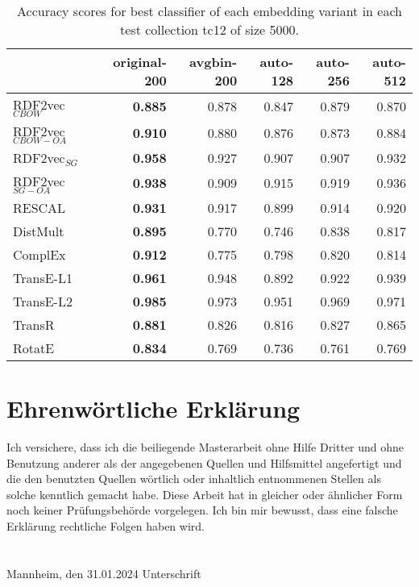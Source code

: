\documentclass[11pt,titlepage,oneside,openany]{book}
\begin{document}
\begin{table}[h!]
\centering
\begin{tabular}{lrrrrr}
\toprule
{} &  original-200 &  avgbin-200 &  auto-128 &  auto-256 &  auto-512 \\
\midrule
RDF2vec$_{CBOW}$     &	\textbf{0.885} &       0.878  &     0.847  &     0.879  &     0.870  \\
RDF2vec$_{CBOW-OA}$  &	\textbf{0.910} &       0.880  &     0.876  &     0.873  &     0.884  \\
RDF2vec$_{SG}$       &	\textbf{0.958} &       0.927  &     0.907  &     0.907  &     0.932  \\
RDF2vec$_{SG-OA}$    &	\textbf{0.938} &       0.909  &     0.915  &     0.919  &     0.936  \\
RESCAL               &	\textbf{0.931} &       0.917  &     0.899  &     0.914  &     0.920  \\
DistMult             &	\textbf{0.895} &       0.770  &     0.746  &     0.838  &     0.817  \\
ComplEx              &	\textbf{0.912} &       0.775  &     0.798  &     0.820  &     0.814  \\
TransE-L1            &	\textbf{0.961} &       0.948  &     0.892  &     0.922  &     0.939  \\
TransE-L2            &	\textbf{0.985} &       0.973  &     0.951  &     0.969  &     0.971  \\
TransR               &	\textbf{0.881} &       0.826  &     0.816  &     0.827  &     0.865  \\
RotatE               &	\textbf{0.834} &       0.769  &     0.736  &     0.761  &     0.769  \\
\bottomrule
\end{tabular}
\caption{Accuracy scores for best classifier of each embedding variant in each test collection tc12 of size 5000.}
\label{tab:dlcc-acc-tc12-5000}
\end{table}

\newpage


\pagestyle{empty}


\section*{Ehrenw\"ortliche Erkl\"arung}
Ich versichere, dass ich die beiliegende Masterarbeit ohne Hilfe Dritter
und ohne Benutzung anderer als der angegebenen Quellen und Hilfsmittel
angefertigt und die den benutzten Quellen w\"ortlich oder inhaltlich
entnommenen Stellen als solche kenntlich gemacht habe. Diese Arbeit
hat in gleicher oder \"ahnlicher Form noch keiner Pr\"ufungsbeh\"orde
vorgelegen. Ich bin mir bewusst, dass eine falsche Erkl\"arung rechtliche Folgen haben
wird.
\\
\\
\\
\noindent
Mannheim, den 31.01.2024 \hspace{4cm} Unterschrift
\end{document}
